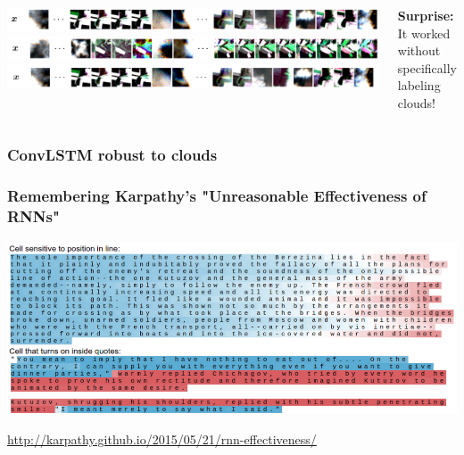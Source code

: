 
\begin{frame}

\vfill
\Huge\color{black}
\begin{center}
	\begin{columns}
		\column{\textwidth}
		
		
		\includegraphics[width=\textwidth]{images/x_1}
		\includegraphics[width=\textwidth]{images/x_2}
		\includegraphics[width=\textwidth]{images/x_3}
		
		\vspace{3em}
		
		
		\textbf{\color{tumbluedark}Surprise:} 
		\hfill It worked without specifically labeling clouds!
	\end{columns}
\end{center}

\vfill

\end{frame}

\begin{frame}
\frametitle{ConvLSTM robust to clouds}


\end{frame}


\begin{frame}
	\frametitle{Remembering Karpathy's "Unreasonable Effectiveness of RNNs"}
	
	\includegraphics[width=\textwidth]{images/karpathy}
	
	\url{http://karpathy.github.io/2015/05/21/rnn-effectiveness/}
\end{frame}

